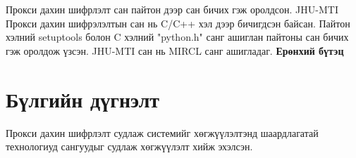 Прокси дахин шифрлэлт сан пайтон дээр сан бичих гэж оролдсон. JHU-MTI Прокси дахин шифрэлэлтын сан нь C/C++ хэл дээр бичигдсэн байсан. Пайтон хэлний setuptools болон C хэлний "python.h" санг ашиглан пайтоны сан бичих гэж оролдож үзсэн. JHU-MTI сан нь MIRCL санг ашигладаг.
\textbf{Ерөнхий бүтэц}


\section{Бүлгийн дүгнэлт}
Прокси дахин шифрлэлт судлаж системийг хөгжүүлэлтэнд шаардлагатай технологиуд сангуудыг судлаж хөгжүүлэлт хийж эхэлсэн.